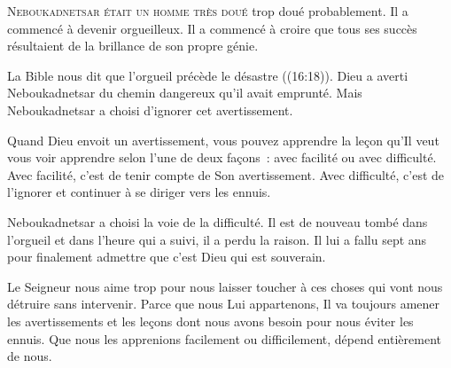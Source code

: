 


\lettrine{N}{eboukadnetsar était un homme très doué}
 \ocadr trop doué probablement. Il a commencé à devenir orgueilleux.
 Il a commencé à croire que tous ses succès résultaient de la brillance
 de son propre génie. 

La Bible nous dit que \og l'orgueil précède le désastre \fg{}
 ((16:18)).
 Dieu a averti Neboukadnetsar du chemin dangereux qu'il avait emprunté.
 Mais Neboukadnetsar a choisi d'ignorer cet avertissement. 


Quand Dieu envoit un avertissement, vous pouvez apprendre la leçon
 qu'Il veut vous voir apprendre selon l'une de deux façons~:
 avec facilité ou avec difficulté. Avec facilité,
 c'est de tenir compte de Son avertissement. Avec difficulté,
 c'est de l'ignorer et continuer à se diriger vers les ennuis. 

Neboukadnetsar a choisi la voie de la difficulté.
 Il est de nouveau tombé dans l'orgueil et dans l'heure qui a suivi,
 il a perdu la raison. Il lui a fallu sept ans pour finalement admettre
 que c'est  Dieu qui est souverain. 

Le Seigneur nous aime trop pour nous laisser toucher à ces choses
 qui vont nous détruire sans intervenir. Parce que nous Lui appartenons,
 Il va toujours amener les avertissements et les leçons
 dont nous avons besoin pour nous éviter les ennuis.
 Que nous les apprenions facilement ou difficilement,
 dépend entièrement de nous. 

\dvrule





